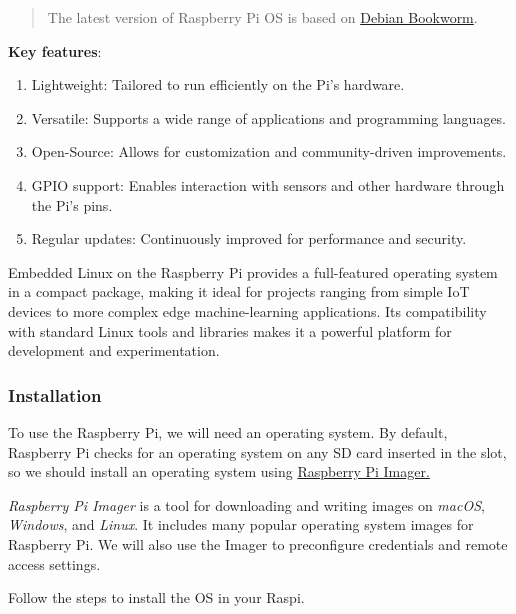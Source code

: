 \documentclass[
]{article}
\providecommand{\tightlist}{%
  \setlength{\itemsep}{0pt}\setlength{\parskip}{0pt}}\usepackage{longtable,booktabs,array}
\begin{document}
\begin{quote}
The latest version of Raspberry Pi OS is based on
\href{https://www.raspberrypi.com/news/bookworm-the-new-version-of-raspberry-pi-os/}{Debian
Bookworm}.
\end{quote}

\textbf{Key features}:

\begin{enumerate}
\def\labelenumi{\arabic{enumi}.}
\tightlist
\item
  Lightweight: Tailored to run efficiently on the Pi's hardware.
\item
  Versatile: Supports a wide range of applications and programming
  languages.
\item
  Open-Source: Allows for customization and community-driven
  improvements.
\item
  GPIO support: Enables interaction with sensors and other hardware
  through the Pi's pins.
\item
  Regular updates: Continuously improved for performance and security.
\end{enumerate}

Embedded Linux on the Raspberry Pi provides a full-featured operating
system in a compact package, making it ideal for projects ranging from
simple IoT devices to more complex edge machine-learning applications.
Its compatibility with standard Linux tools and libraries makes it a
powerful platform for development and experimentation.

\subsubsection{Installation}\label{sec-setup-installation-1c39}

To use the Raspberry Pi, we will need an operating system. By default,
Raspberry Pi checks for an operating system on any SD card inserted in
the slot, so we should install an operating system using
\href{https://www.raspberrypi.com/software/}{Raspberry Pi Imager.}

\emph{Raspberry Pi Imager} is a tool for downloading and writing images
on \emph{macOS}, \emph{Windows}, and \emph{Linux}. It includes many
popular operating system images for Raspberry Pi. We will also use the
Imager to preconfigure credentials and remote access settings.

Follow the steps to install the OS in your Raspi.
\end{document}

